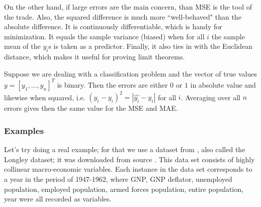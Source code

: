 \documentclass[english, a4paper]{article}
\begin{document}
On the other hand, if large errors are the main concern, than MSE is the tool of the trade. Also, the squared difference is much more ``well-behaved" than the absolute difference. It is continuously differentiable, which is handy for minimization. It equals the sample variance (biased) when for all $i$ the sample mean of the $y_{i}$s is taken as a predictor. Finally, it also ties in with the Euclidean distance, which makes it useful for proving limit theorems.

Suppose we are dealing with a classification problem and the vector of true values $y=[y_{1},\dots,y_{n}]^{T}$ is binary. Then the errors are either $0$ or $1$ in absolute value and likewise when squared, i.e. $(\hat{y_{i}} - y_{i})^{2}=|\hat{y_{i}}-y_{i}|$ for all $i$. Averaging over all $n$ errors gives then the same value for the MSE and MAE.

\subsubsection{Examples}
Let's try doing a real example; for that we use a dataset from \cite{Longl}, also called the Longley dataset; it was downloaded from source \cite{WinNT}. This data set consists of highly collinear macro-economic variables. Each instance in the data set corresponds to a year in the period of 1947-1962, where GNP, GNP deflator, unemployed population, employed population, armed forces population, entire population, year were all recorded as variables.

\end{document}

